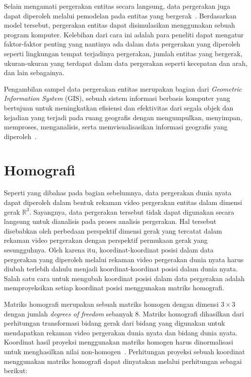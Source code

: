 Selain mengamati pergerakan entitas secara langsung, data pergerakan juga dapat diperoleh melalui pemodelan pada entitas yang bergerak~\cite{wiratma:trajectory}. Berdasarkan model tersebut, pergerakan entitas dapat disimulasikan menggunakan sebuah program komputer. Kelebihan dari cara ini adalah para peneliti dapat mengatur faktor-faktor penting yang nantinya ada dalam data pergerakan yang diperoleh seperti lingkungan tempat terjadinya pergerakan, jumlah entitas yang bergerak, ukuran-ukuran yang terdapat dalam data pergerakan seperti kecepatan dan arah, dan lain sebagainya. 

Pengambilan sampel data pergerakan entitas merupakan bagian dari \textit{Geometric Information System} (GIS), sebuah sistem informasi berbasis komputer yang bertujuan untuk meningkatkan efisiensi dan efektivitas dari segala objek dan kejadian yang terjadi pada ruang geografis dengan mengumpulkan, menyimpan, memproses, menganalisis, serta memvisualisasikan informasi geografis yang diperoleh~\cite{longley:02:gis}.

\section{Homografi}
\label{sec:homography}

Seperti yang dibahas pada bagian sebelumnya, data pergerakan dunia nyata dapat diperoleh dalam bentuk rekaman video pergerakan entitas dalam dimensi gerak $\mathbb{R}^3$. Sayangnya, data pergerakan tersebut tidak dapat digunakan secara langsung untuk dianalisis pada proses analisis pergerakan. Hal tersebut disebabkan oleh perbedaan perspektif dimensi gerak yang tercatat dalam rekaman video pergerakan dengan perspektif permukaan gerak yang sesungguhnya. Oleh karena itu, koordinat-koordinat posisi dalam data pergerakan yang diperoleh melalui rekaman video pergerakan dunia nyata harus diubah terlebih dahulu menjadi koordinat-koordinat posisi dalam dunia nyata. Salah satu cara untuk mengubah koordinat posisi dalam data pergerakan adalah memproyeksikan setiap koordinat posisi menggunakan matriks homografi.

Matriks homografi merupakan sebuah matriks homogen dengan dimensi $3 \times 3$ dengan jumlah \textit{degrees of freedom} sebanyak $8$. Matriks homografi dihasilkan dari perhitungan transformasi bidang gerak dari bidang yang digunakan untuk mendapatkan rekaman video pergerakan dunia nyata dan bidang dunia nyata. Koordinat hasil proyeksi menggunakan matriks homogen harus dinormalisasi untuk menghasilkan nilai non-homogen~\cite{szeliski:02:homography}. Perhitungan proyeksi sebuah koordinat menggunakan matriks homografi dapat dinyatakan melalui perhitungan sebagai berikut:

